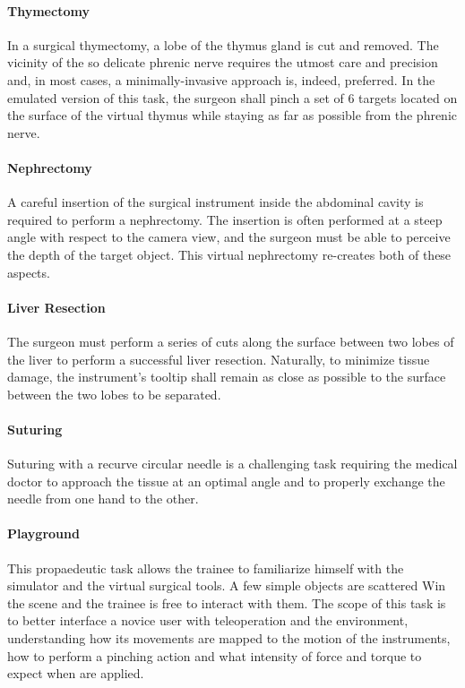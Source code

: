 \documentclass[../main.tex]{subfiles}
\begin{document}
\paragraph{Thymectomy} In a surgical thymectomy, a lobe of the thymus gland is cut and removed. The vicinity of the so delicate phrenic nerve requires the utmost care and precision and, in most cases, a minimally-invasive approach is, indeed, preferred. In the emulated version of this task, the surgeon shall pinch a set of 6 targets located on the surface of the virtual thymus while staying as far as possible from the phrenic nerve. 
\paragraph{Nephrectomy} A careful insertion of the surgical instrument inside the abdominal cavity is required to perform a nephrectomy. The insertion is often performed at a steep angle with respect to the camera view, and the surgeon must be able to perceive the depth of the target object. This virtual nephrectomy re-creates both of these aspects.
\paragraph{Liver Resection} The surgeon must perform a series of cuts along the surface between two lobes of the liver to perform a successful liver resection. Naturally, to minimize tissue damage, the instrument's tooltip shall remain as close as possible to the surface between the two lobes to be separated.
\paragraph{Suturing} Suturing with a recurve circular needle is a challenging task requiring the medical doctor to approach the tissue at an optimal angle and to properly exchange the needle from one hand to the other.  
\paragraph{Playground} This propaedeutic task allows the trainee to familiarize himself with the simulator and the virtual surgical tools. A few simple objects are scattered Win the scene and the trainee is free to interact with them. The scope of this task is to better interface a novice user with teleoperation and the \vr environment, understanding how its movements are mapped to the motion of the instruments, how to perform a pinching action and what intensity of force and torque to expect when \vfs are applied. 
\end{document}
